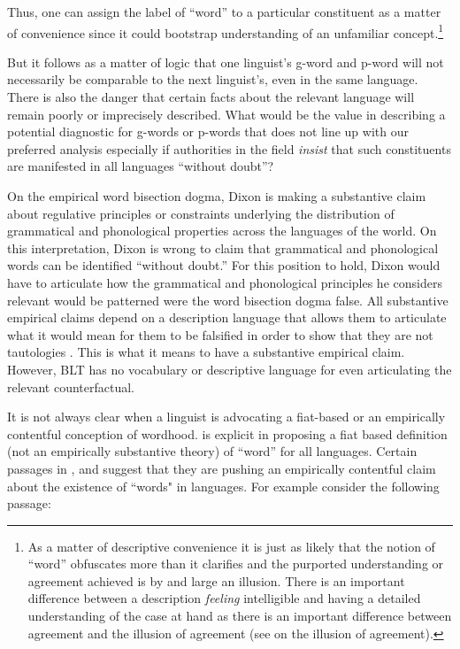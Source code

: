 \documentclass[output=paper,hidelinks]{langscibook}
\begin{document}
Thus, one can assign the label of ``word'' to a particular constituent as a matter of convenience since it could bootstrap understanding of an unfamiliar concept.\footnote{As a matter of descriptive convenience it is just as likely that the notion of ``word'' obfuscates more than it clarifies and the purported understanding or agreement achieved is by and large an illusion. There is an important difference between a description \textit{feeling} intelligible and having a detailed understanding of the case at hand as there is an important difference between agreement and the illusion of agreement  (see \citealt{smaldino2017models, kahneman2021noise} on the illusion of agreement).}

But it follows as a matter of logic that one linguist's g-word and p-word will not necessarily be comparable to the next linguist's, even in the same language. There is also the danger that certain facts about the relevant language will remain poorly or imprecisely described. What would be the value in describing a potential diagnostic for g-words or p-words that does not line up with our preferred analysis \citep{haspelmathword:2011} especially if authorities in the field \textit{insist} that such constituents are manifested in all languages ``without doubt''?

On the empirical word bisection dogma, Dixon is making a substantive claim about regulative principles or constraints underlying the distribution of grammatical and phonological properties across the languages of the world. On this interpretation, Dixon is wrong to claim that grammatical and phonological words can be identified ``without doubt.'' For this position to hold, Dixon would have to articulate how the grammatical and phonological principles he considers relevant would be patterned were the word bisection dogma false. All substantive empirical claims depend on a description language that allows them to articulate what it would mean for them to be falsified in order to show that they are not tautologies \citep{mayo2018statistical}. This is what it means to have a substantive empirical claim. However, BLT has no vocabulary or descriptive language for even articulating the relevant counterfactual.

It is not always clear when a linguist is advocating a fiat-based or an empirically contentful conception of wordhood. \citet{haspelmath2022defining} is explicit in proposing a fiat based definition (not an empirically substantive theory) of ``word'' for all languages. Certain passages in \citet{dixonaikhenvald02}, \citet{dixon2010basica} and \citet{aikhenvald2020essence} suggest that they are pushing an empirically contentful claim about the existence of ``words" in languages. For example consider the following passage:
\end{document}

